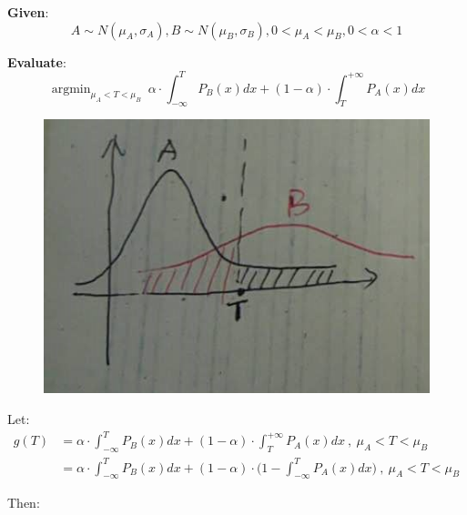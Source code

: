 \documentclass[10pt,a4paper]{article}
\begin{document}
	\textbf{Given}: $$A \sim N(\mu_A, \sigma_A), B \sim N(\mu_B, \sigma_B), 0 < \mu_A < \mu_B, 0 < \alpha < 1$$
	
	\textbf{Evaluate}: $$\mathop{\arg\min}_{\mu_A < T < \mu_B}\ \alpha \cdot \int_{-\infty}^{T}P_B(x)dx + (1 - \alpha) \cdot \int_{T}^{+\infty}P_A(x)dx$$
	
	\begin{figure}[!ht]
		\centering
		\includegraphics[width=0.5\linewidth]{SamplePic.jpg}
	\end{figure}
	
	Let:
	\begin{equation}
		\begin{split}
		g(T) & = \alpha \cdot \int_{-\infty}^{T}P_B(x)dx + (1 - \alpha) \cdot \int_{T}^{+\infty}P_A(x)dx \ ,\ \mu_A < T < \mu_B\\
		& = \alpha \cdot \int_{-\infty}^{T}P_B(x)dx + (1 - \alpha) \cdot \Big(1 - \int_{-\infty}^{T}P_A(x)dx\Big) \ ,\ \mu_A < T < \mu_B
		\end{split}
	\end{equation}
	
	
	Then:
	
	
\end{document}
